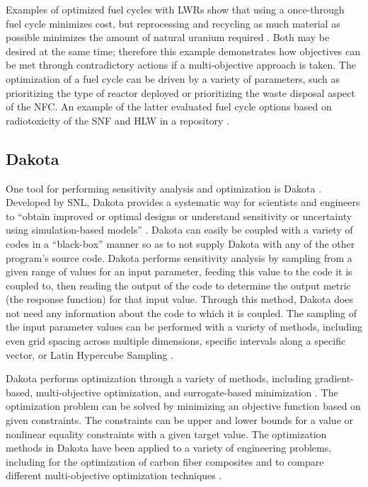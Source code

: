 Examples of optimized fuel cycles with \glspl{LWR} show that using a
once-through fuel cycle minimizes cost, but reprocessing and recycling as 
much material as possible minimizes the amount of natural uranium 
required \cite{kunsch_nuclear_1987}. Both may 
be desired at the same time; therefore this example demonstrates how 
objectives can be met through contradictory actions if a multi-objective 
approach is taken. The optimization of a fuel cycle can be driven 
by a variety of parameters, such as prioritizing the type of reactor 
deployed or prioritizing the waste disposal 
aspect of the \gls{NFC}. An example of the latter 
evaluated fuel cycle options based on radiotoxicity of the \gls{SNF} and 
\gls{HLW} in a repository \cite{del_cul_advanced_2010}. 

\subsection{Dakota}
One tool for performing sensitivity analysis and optimization is 
Dakota \cite{adams_dakota_2021}. Developed by \gls{SNL}, Dakota provides 
a systematic way for scientists and 
engineers to ``obtain improved or optimal designs or understand sensitivity
or uncertainty using simulation-based models'' \cite{adams_dakota_2021}.
Dakota can easily be coupled with a variety of codes in a ``black-box'' 
manner so as to not supply Dakota with any of the other program's source code.
Dakota performs sensitivity analysis by sampling from a given range of 
values for an input parameter, feeding this value to the code it is 
coupled to, then reading the output of the code to determine the output 
metric (the response function) for that input value. Through this method, 
Dakota does not need any information about the code to which it is coupled. 
The sampling of the input parameter values can be performed with a variety of 
methods, including even grid spacing across multiple dimensions, specific 
intervals along a specific vector, or Latin Hypercube Sampling 
\cite{adams_dakota_2021}.

Dakota performs optimization through a variety of methods, including
gradient-based, multi-objective optimization, and surrogate-based 
minimization \cite{adams_dakota_2021}. The optimization problem can be 
solved by minimizing an objective function based on given constraints. The 
constraints can be upper and lower bounds for a value or nonlinear 
equality constraints with a given target value. The optimization 
methods in Dakota have been applied to a variety of engineering problems,
including for the optimization of carbon fiber composites 
\cite{skulborstad_multi-objective_2018} and to compare different 
multi-objective optimization techniques \cite{chiandussi_comparison_2012}. 

